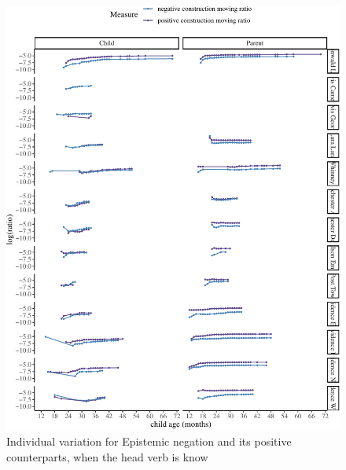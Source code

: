 \documentclass[
  english,
  man,floatsintext]{apa6}
\begin{document}
\begin{figure}[H]

{\centering \includegraphics{neg_construction_article_files/figure-latex/individualepistemicknow-1} 

}

\caption{Individual variation for Epistemic negation and its positive counterparts, when the head verb is know}\label{fig:individualepistemicknow}
\end{figure}
\end{document}
